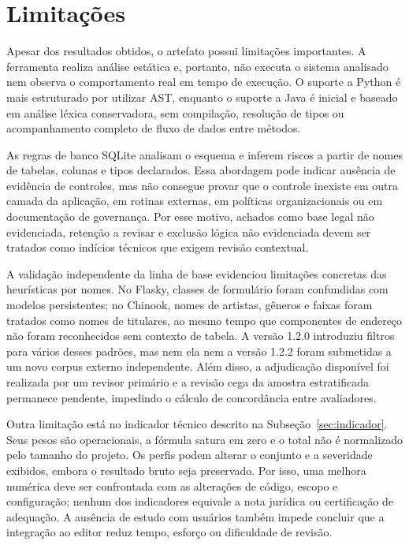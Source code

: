 \documentclass[12pt,a4paper,oneside]{report}
\begin{document}
\section{Limitações}

Apesar dos resultados obtidos, o artefato possui limitações importantes. A ferramenta realiza análise estática e, portanto, não executa o sistema analisado nem observa o comportamento real em tempo de execução. O suporte a Python é mais estruturado por utilizar AST, enquanto o suporte a Java é inicial e baseado em análise léxica conservadora, sem compilação, resolução de tipos ou acompanhamento completo de fluxo de dados entre métodos.

As regras de banco SQLite analisam o esquema e inferem riscos a partir de nomes de tabelas, colunas e tipos declarados. Essa abordagem pode indicar ausência de evidência de controles, mas não consegue provar que o controle inexiste em outra camada da aplicação, em rotinas externas, em políticas organizacionais ou em documentação de governança. Por esse motivo, achados como base legal não evidenciada, retenção a revisar e exclusão lógica não evidenciada devem ser tratados como indícios técnicos que exigem revisão contextual.

A validação independente da linha de base evidenciou limitações concretas das heurísticas por nomes. No Flasky, classes de formulário foram confundidas com modelos persistentes; no Chinook, nomes de artistas, gêneros e faixas foram tratados como nomes de titulares, ao mesmo tempo que componentes de endereço não foram reconhecidos sem contexto de tabela. A versão 1.2.0 introduziu filtros para vários desses padrões, mas nem ela nem a versão 1.2.2 foram submetidas a um novo corpus externo independente. Além disso, a adjudicação disponível foi realizada por um revisor primário e a revisão cega da amostra estratificada permanece pendente, impedindo o cálculo de concordância entre avaliadores.

Outra limitação está no indicador técnico descrito na Subseção~\ref{sec:indicador}. Seus pesos são operacionais, a fórmula satura em zero e o total não é normalizado pelo tamanho do projeto. Os perfis podem alterar o conjunto e a severidade exibidos, embora o resultado bruto seja preservado. Por isso, uma melhora numérica deve ser confrontada com as alterações de código, escopo e configuração; nenhum dos indicadores equivale a nota jurídica ou certificação de adequação. A ausência de estudo com usuários também impede concluir que a integração ao editor reduz tempo, esforço ou dificuldade de revisão.
\end{document}
